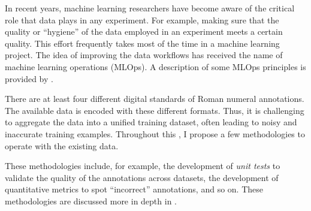 

In recent years, machine learning researchers have become
aware of the critical role that data plays in any
experiment. For example, making sure that the quality or
``hygiene'' of the data employed in an experiment meets a
certain quality. This effort frequently takes most of the
time in a machine learning project. The idea of improving
the data workflows has received the name of machine learning
operations (MLOps). A description of some MLOps principles
is provided by \textcite{renggli2021data}.

There are at least four different digital standards of Roman
numeral annotations. The available data is encoded with
these different formats. Thus, it is challenging to
aggregate the data into a unified training dataset, often
leading to noisy and inaccurate training examples.
Throughout this \thesisdiss{}, I propose a few methodologies
to operate with the existing data.

These methodologies include, for example, the development of
\emph{unit tests} to validate the quality of the annotations
across datasets, the development of quantitative metrics to spot ``incorrect'' annotations, and so on. These methodologies are discussed more in depth in .
